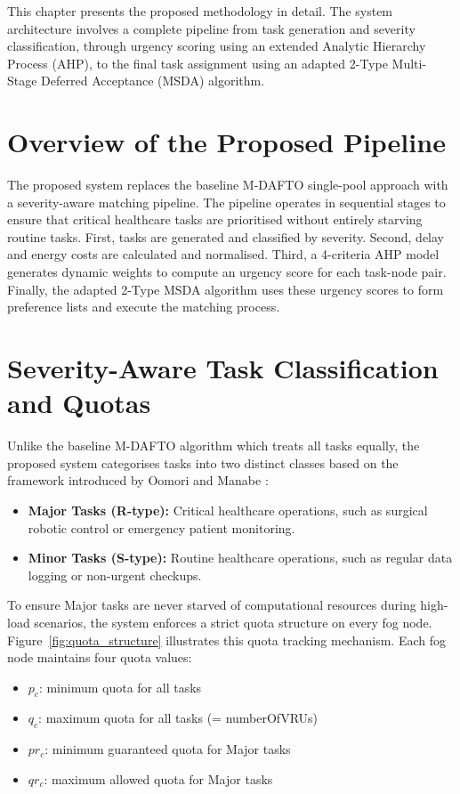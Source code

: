 
\noindent This chapter presents the proposed methodology in detail. The system architecture involves a complete pipeline from task generation and severity classification, through urgency scoring using an extended Analytic Hierarchy Process (AHP), to the final task assignment using an adapted 2-Type Multi-Stage Deferred Acceptance (MSDA) algorithm.

\section{Overview of the Proposed Pipeline}

The proposed system replaces the baseline M-DAFTO single-pool approach with a severity-aware matching pipeline. The pipeline operates in sequential stages to ensure that critical healthcare tasks are prioritised without entirely starving routine tasks. First, tasks are generated and classified by severity. Second, delay and energy costs are calculated and normalised. Third, a 4-criteria AHP model generates dynamic weights to compute an urgency score for each task-node pair. Finally, the adapted 2-Type MSDA algorithm uses these urgency scores to form preference lists and execute the matching process.

\section{Severity-Aware Task Classification and Quotas}

Unlike the baseline M-DAFTO algorithm which treats all tasks equally, the proposed system categorises tasks into two distinct classes based on the framework introduced by Oomori and Manabe \cite{oomori2026strategyproof}:
\begin{itemize}
\item \textbf{Major Tasks (R-type):} Critical healthcare operations, such as surgical robotic control or emergency patient monitoring.
\item \textbf{Minor Tasks (S-type):} Routine healthcare operations, such as regular data logging or non-urgent checkups.
\end{itemize}

To ensure Major tasks are never starved of computational resources during high-load scenarios, the system enforces a strict quota structure on every fog node. 
Figure~\ref{fig:quota_structure} illustrates this quota tracking mechanism. Each fog node maintains four quota values:
\begin{itemize}
\item $p_c$: minimum quota for all tasks
\item $q_c$: maximum quota for all tasks (= numberOfVRUs)
\item $pr_c$: minimum guaranteed quota for Major tasks
\item $qr_c$: maximum allowed quota for Major tasks
\end{itemize}

